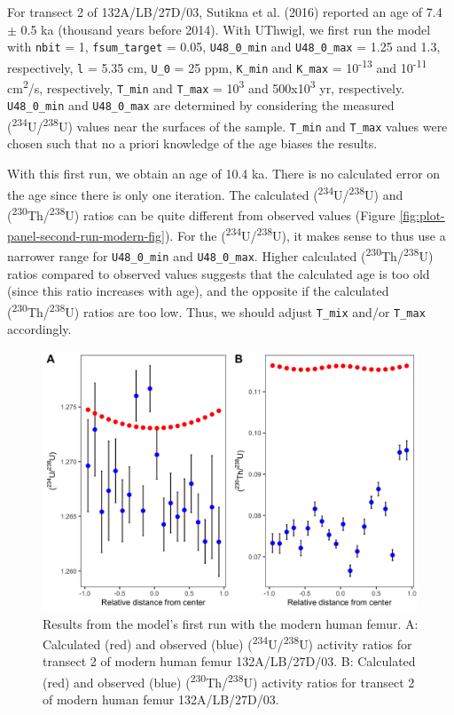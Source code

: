 \documentclass[]{elsarticle} %
\begin{document}
For transect 2 of 132A/LB/27D/03, Sutikna et al. (2016) reported an age of 7.4 \(\pm\) 0.5 ka (thousand years before 2014). With UThwigl, we first run the model with \texttt{nbit} = 1, \texttt{fsum\_target} = 0.05, \texttt{U48\_0\_min} and \texttt{U48\_0\_max} = 1.25 and 1.3, respectively, \texttt{l} = 5.35 cm, \texttt{U\_0} = 25 ppm, \texttt{K\_min} and \texttt{K\_max} = 10\textsuperscript{-13} and 10\textsuperscript{-11} cm\textsuperscript{2}/s, respectively, \texttt{T\_min} and \texttt{T\_max} = 10\textsuperscript{3} and 500x10\textsuperscript{3} yr, respectively. \texttt{U48\_0\_min} and \texttt{U48\_0\_max} are determined by considering the measured (\textsuperscript{234}U/\textsuperscript{238}U) values near the surfaces of the sample. \texttt{T\_min} and \texttt{T\_max} values were chosen such that no a priori knowledge of the age biases the results.

With this first run, we obtain an age of 10.4 ka. There is no calculated error on the age since there is only one iteration. The calculated (\textsuperscript{234}U/\textsuperscript{238}U) and (\textsuperscript{230}Th/\textsuperscript{238}U) ratios can be quite different from observed values (Figure \ref{fig:plot-panel-second-run-modern-fig}). For the (\textsuperscript{234}U/\textsuperscript{238}U), it makes sense to thus use a narrower range for \texttt{U48\_0\_min} and \texttt{U48\_0\_max}. Higher calculated (\textsuperscript{230}Th/\textsuperscript{238}U) ratios compared to observed values suggests that the calculated age is too old (since this ratio increases with age), and the opposite if the calculated (\textsuperscript{230}Th/\textsuperscript{238}U) ratios are too low. Thus, we should adjust \texttt{T\_mix} and/or \texttt{T\_max} accordingly.



\begin{figure}
\includegraphics[width=0.95\linewidth]{figures/plot-panel-first-run-modern} \caption{Results from the model's first run with the modern human femur. A: Calculated (red) and observed (blue) (\textsuperscript{234}U/\textsuperscript{238}U) activity ratios for transect 2 of modern human femur 132A/LB/27D/03. B: Calculated (red) and observed (blue) (\textsuperscript{230}Th/\textsuperscript{238}U) activity ratios for transect 2 of modern human femur 132A/LB/27D/03.}\label{fig:plot-panel-first-run-modern-fig}
\end{figure}
\end{document}
